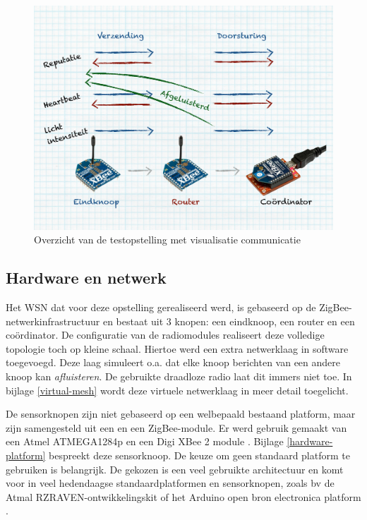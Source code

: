 \begin{figure}[ht]
  \centering
  \includegraphics[width=0.75\linewidth]{resources/setup.pdf}
  \caption{Overzicht van de testopstelling met visualisatie communicatie}
  \label{fig:setup}
\end{figure}

\vspace{-5mm}

\subsection{Hardware en netwerk}
\label{subsection:eval-hardware}

Het WSN dat voor deze opstelling gerealiseerd werd, is gebaseerd op de
ZigBee-netwerkinfrastructuur en bestaat uit 3 knopen: een eindknoop, een router
en een co\"ordinator. De configuratie van de radiomodules realiseert deze
volledige topologie toch op kleine schaal. Hiertoe werd een extra netwerklaag
in software toegevoegd. Deze laag simuleert o.a. dat elke knoop berichten van
een andere knoop kan \emph{afluisteren}. De gebruikte draadloze radio laat dit
immers niet toe. In bijlage \ref{virtual-mesh} wordt deze virtuele netwerklaag
in meer detail toegelicht.

De sensorknopen zijn niet gebaseerd op een welbepaald bestaand platform, maar
zijn samengesteld uit een \mcu en een ZigBee-module. Er werd gebruik gemaakt
van een Atmel ATMEGA1284p \citep{datasheet:atmega1284p} en een Digi XBee 2
module \citep{manual:xbee}. Bijlage \ref{hardware-platform} bespreekt deze
sensorknoop. De keuze om geen standaard platform te gebruiken is belangrijk. De
gekozen \mcu is een veel gebruikte architectuur en komt voor in veel
hedendaagse standaardplatformen en sensorknopen, zoals bv de Atmal
RZRAVEN-ontwikkelingskit \citep{manual:rzraven} of het Arduino open bron
electronica platform \citep{url:arduino}.

